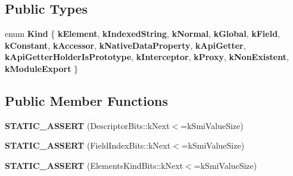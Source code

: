 \subsection*{Public Types}
\begin{DoxyCompactItemize}
\item 
\mbox{\label{classv8_1_1internal_1_1LoadHandler_af9bbc69b2507ed53c01fced3e2b388ad}} 
enum {\bfseries Kind} \{ \newline
{\bfseries k\+Element}, 
{\bfseries k\+Indexed\+String}, 
{\bfseries k\+Normal}, 
{\bfseries k\+Global}, 
\newline
{\bfseries k\+Field}, 
{\bfseries k\+Constant}, 
{\bfseries k\+Accessor}, 
{\bfseries k\+Native\+Data\+Property}, 
\newline
{\bfseries k\+Api\+Getter}, 
{\bfseries k\+Api\+Getter\+Holder\+Is\+Prototype}, 
{\bfseries k\+Interceptor}, 
{\bfseries k\+Proxy}, 
\newline
{\bfseries k\+Non\+Existent}, 
{\bfseries k\+Module\+Export}
 \}
\end{DoxyCompactItemize}
\subsection*{Public Member Functions}
\begin{DoxyCompactItemize}
\item 
\mbox{\label{classv8_1_1internal_1_1LoadHandler_a92f1bfd030e6102b96ca5aa05bbd0a6d}} 
{\bfseries S\+T\+A\+T\+I\+C\+\_\+\+A\+S\+S\+E\+RT} (Descriptor\+Bits\+::k\+Next$<$=k\+Smi\+Value\+Size)
\item 
\mbox{\label{classv8_1_1internal_1_1LoadHandler_aad0453b2488dc7cfdda6ddd6b51f6e6e}} 
{\bfseries S\+T\+A\+T\+I\+C\+\_\+\+A\+S\+S\+E\+RT} (Field\+Index\+Bits\+::k\+Next$<$=k\+Smi\+Value\+Size)
\item 
\mbox{\label{classv8_1_1internal_1_1LoadHandler_ab209a7751b039b320522fb830282c97b}} 
{\bfseries S\+T\+A\+T\+I\+C\+\_\+\+A\+S\+S\+E\+RT} (Elements\+Kind\+Bits\+::k\+Next$<$=k\+Smi\+Value\+Size)
\end{DoxyCompactItemize}
